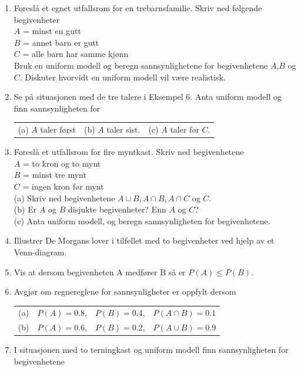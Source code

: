 \begin{enumerate}
\item  Foreslå et egnet utfallsrom for en trebarnsfamilie. Skriv
     ned følgende begivenheter \\[1mm]
       $A$ = minst en gutt \\
       $B$ = annet barn er gutt \\
       $C$ = alle barn har samme kjønn \\[1mm]
     Bruk en uniform modell og beregn sannsynlighetene for
     begivenhetene $A$,$B$ og $C$.
     Diskuter hvorvidt en uniform modell vil være realistisk.
\item  Se på situasjonen med de tre talere i Eksempel 6. Anta
     uniform modell og finn sannsynligheten for
    \begin{center}
    \begin{tabular}{ccc}
     (a) $A$ taler først &
     (b) $A$ taler sist. &
     (c) $A$ taler før $C$.
    \end{tabular}
    \end{center}
\item  Foreslå et utfallsrom for fire myntkast. Skriv ned
     begivenhetene \\[1mm]
       $A$ = to kron og to mynt \\
       $B$ = minst tre mynt \\
       $C$ = ingen kron før mynt \\[1mm]
     (a) Skriv ned begivenhetene $A\cup B, A\cap B, A\cap C$ og $\bar{C}$.\\
     (b) Er $A$ og $B$ disjukte begivenheter? Enn $A$ og $C$? \\
     (c) Anta uniform modell, og beregn sannsynligheten for begivenhetene.
\item Illustrer De Morgans lover i tilfellet med to begivenheter
     ved hjelp av et Venn-diagram.
\item  Vis at dersom begivenheten A medfører B så er $P(A) \leq
     P(B)$.
\item  Avgjør om regnereglene for sannsynligheter er oppfylt dersom \\[1mm]
   \begin{tabular}{cccc}
     (a)&$P(A)=0.8$, & $P(B)=0.4$, & $P(A\cap B)=0.1$ \\
     (b)&$P(A)=0.6$, & $P(B)=0.2$, & $P(A\cup B)=0.9$ 
   \end{tabular}
\item  I situasjonen med to terningkast og uniform modell finn
     sannsynligheten for begivenhetene \\

\end{enumerate}
